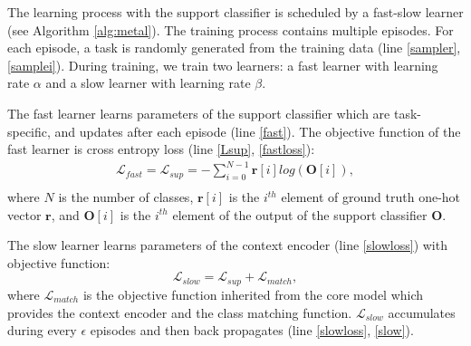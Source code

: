 The learning process with the support classifier is scheduled by a fast-slow learner (see Algorithm \ref{alg:metal}).
The training process contains multiple episodes. For each episode, a task is randomly generated from the training data (line \ref{sampler}, \ref{samplei}).
During training, we train two learners: a fast learner with learning rate $\alpha$ and a slow learner with learning rate $\beta$.

The fast learner learns parameters of the support classifier which are task-specific, and updates after each episode (line \ref{fast}). The objective function of the fast learner is cross entropy loss (line \ref{Lsup}, \ref{fastloss}):
\begin{equation}
\begin{aligned}
    \mathcal{L}_{fast} = \mathcal{L}_{sup}= - \sum_{i=0}^{N-1} \mathbf{r}[i] log(\mathbf{O}[i]), \\
\end{aligned}
\end{equation}
where $N$ is the number of classes, $\mathbf{r}[i]$ is the $i^{th}$ element of ground truth one-hot vector $\mathbf{r}$, and $\mathbf{O}[i]$ is the $i^{th}$ element of the output of the support classifier $\mathbf{O}$.

The slow learner learns parameters of the context encoder (line \ref{slowloss}) with objective function:
\begin{equation}
\mathcal{L}_{slow} = \mathcal{L}_{sup} + \mathcal{L}_{match},
\end{equation}
where $\mathcal{L}_{match}$ is the objective function inherited from the core model which provides the context encoder and the class matching function. $\mathcal{L}_{slow}$ accumulates during every $\epsilon$ episodes and then back propagates (line \ref{slowloss}, \ref{slow}).


